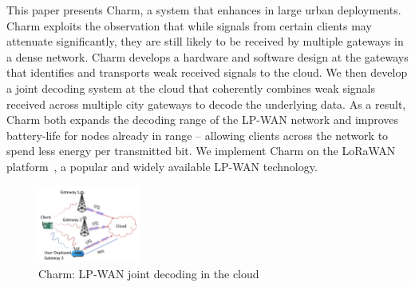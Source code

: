 This paper presents Charm, a system that enhances  in large urban deployments. Charm
exploits the observation that while signals from certain clients may attenuate
significantly, they are still likely to be received by multiple gateways in a
dense network. Charm develops a hardware and software design at the gateways
that identifies and transports weak received signals to the cloud. We then
develop a joint decoding system at the cloud that coherently combines weak
signals received across multiple city gateways to decode the underlying data.
As a result, Charm both expands the decoding range of the LP-WAN network and
improves battery-life for nodes already in range -- allowing clients across
the network to spend less energy per transmitted bit. We implement Charm on
the LoRaWAN platform~\cite{LoRaWanAlliance2015}, a popular and widely
available LP-WAN technology. 



\begin{figure}
    \centering
    \includegraphics[width=0.30\textwidth]{figures/LoRaRAN.pdf}
        \vspace*{-0.1in}
    \caption{Charm: LP-WAN joint decoding in the cloud}
    \vspace*{-0.1in}
    \label{fig:my_label}
    \compactimg
\end{figure}

